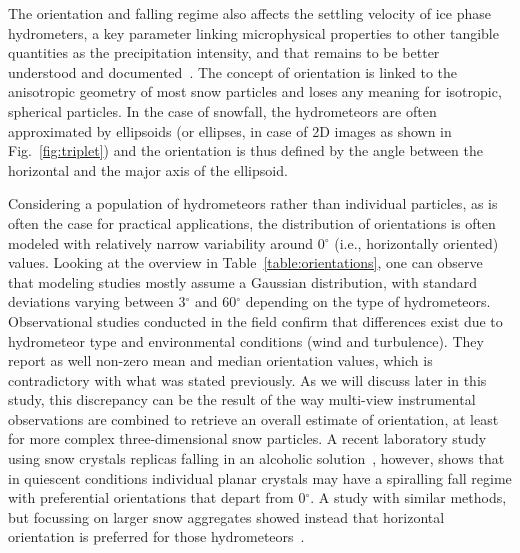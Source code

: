 \documentclass[draft]{agujournal2019}
\begin{document}
The orientation and falling regime also affects the settling velocity of ice phase hydrometers, a key parameter linking microphysical properties to other tangible quantities as the precipitation intensity, and that remains to be better understood and documented~\cite{Heymsfield_JAS_2004}.
The concept of orientation is linked to the anisotropic geometry of most snow particles and loses any meaning for isotropic, spherical particles. In the case of snowfall, the hydrometeors are often approximated by ellipsoids (or ellipses, in case of 2D images as shown in Fig.~\ref{fig:triplet}) and the orientation is thus defined by the angle between the horizontal and the major axis of the ellipsoid.

Considering a population of hydrometeors rather than individual particles, as is often the case for practical applications, the distribution of orientations is often modeled with relatively narrow variability around 0$^\circ$ (i.e., horizontally oriented) values. Looking at the overview in Table~\ref{table:orientations}, one can observe that modeling studies mostly assume a Gaussian distribution, with standard deviations varying between 3$^\circ$ \cite{Matrosov_JAM_2001} and 60$^\circ$ \cite{Putnam_MWR_2017} depending on the type of hydrometeors. Observational studies conducted in the field \cite{Garrett_GRL_2015} confirm that differences exist due to hydrometeor type and environmental conditions (wind and turbulence). They report as well non-zero mean and median orientation values, which is contradictory with what was stated previously. As we will discuss later in this study, this discrepancy can be the result of the way multi-view instrumental observations are combined to retrieve an overall estimate of orientation, at least for more complex three-dimensional snow particles. A recent laboratory study using snow crystals replicas falling in an alcoholic solution~\cite{Stout_ACP_2024}, however, shows that in quiescent conditions individual planar crystals may have a spiralling fall regime with preferential orientations that depart from 0$^\circ$. A study with similar methods, but focussing on larger snow aggregates showed instead that horizontal orientation is preferred for those hydrometeors~\cite{Koebschall_EF_2023}.
\end{document}
